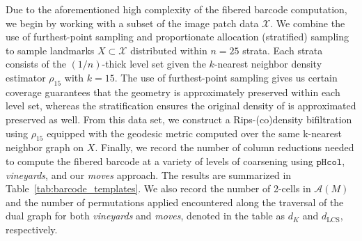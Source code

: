 \documentclass[sn-mathphys]{sn-jnl}
\begin{document}
Due to the aforementioned high complexity of the fibered barcode computation, we begin by working with a subset of the image patch data $\mathcal{X}$. 
We combine the use of furthest-point sampling and proportionate allocation (stratified) sampling to sample landmarks $X \subset \mathcal{X}$ distributed within $n = 25$ strata. Each strata consists of the $(1/n)$-thick level set given the $k$-nearest neighbor density estimator $\rho_{15}$ with $k = 15$. The use of furthest-point sampling gives us certain coverage guarantees that the geometry is approximately preserved within each level set, whereas the stratification ensures the original density of is approximated preserved as well. 
From this data set, we construct a Rips-(co)density bifiltration using $\rho_{15}$ equipped with the geodesic metric computed over the same k-nearest neighbor graph on $X$. 
Finally, we record the number of column reductions needed to compute the fibered barcode at a variety of levels of coarsening using $\mathtt{pHcol}$, \emph{vineyards}, and our \emph{moves} approach. The results are summarized in Table~\ref{tab:barcode_templates}. We also record the number of 2-cells in $\mathcal{A}(M)$ and the number of permutations applied encountered along the traversal of the dual graph for both \emph{vineyards} and \emph{moves}, denoted in the table as $d_K$ and $d_{\mathrm{LCS}}$, respectively. 
\end{document}
